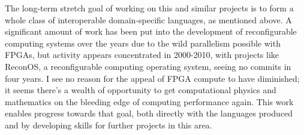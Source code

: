 \documentclass[12pt, arial, letterpaper]{article}
\begin{document}
The long-term stretch goal of working on this and similar projects is to form a whole class of interoperable domain-specific languages, as mentioned above. A significant amount of work has been put into the development of reconfigurable computing systems over the years\cite{moth} due to the wild parallelism possible with FPGAs, but activity appears concentrated in 2000-2010, with projects like ReconOS\cite{recon}, a reconfigurable computing operating system, seeing no commits in four years. I see no reason for the appeal of FPGA compute to have diminished; it seems there's a wealth of opportunity to get computational physics and mathematics on the bleeding edge of computing performance again. This work enables progress towards that goal, both directly with the languages produced and by developing skills for further projects in this area. 



\end{document}
